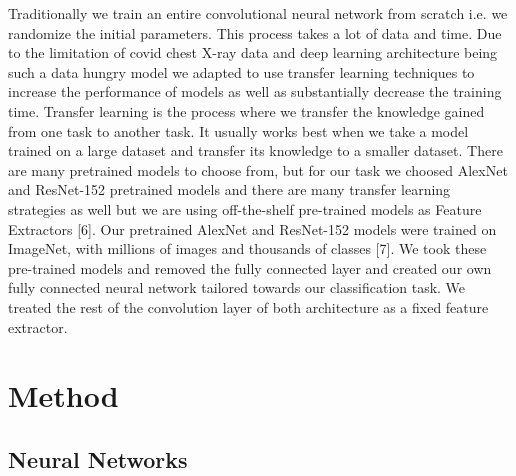 \documentclass[conference,compsoc]{IEEEtran}
\begin{document}
Traditionally we train an entire convolutional neural network from scratch i.e. we randomize the initial parameters. 
This process takes a lot of data and time. Due to the limitation of covid chest X-ray data and deep learning architecture 
being such a data hungry model we adapted to use transfer learning techniques to increase the performance of models as well 
as substantially decrease the training time. Transfer learning is the process where we transfer the knowledge gained from one 
task to another task. It usually works best when we take a model trained on a large dataset and transfer its knowledge to a smaller dataset.
There are many pretrained models to choose from, but for our task we choosed AlexNet and ResNet-152 pretrained models and there are 
many transfer learning strategies as well but we are using off-the-shelf pre-trained models as Feature Extractors [6]. 
Our pretrained AlexNet and ResNet-152 models were trained on ImageNet, with millions of images and thousands of classes
[7]. 
We took these pre-trained models and removed the fully connected layer and created our own fully connected neural network tailored 
towards our classification task. We treated the rest of the convolution layer of both architecture as a fixed feature extractor.  


\section{Method}

\subsection{Neural Networks}

\begin{description}[leftmargin=*,labelindent=0pt]
		\item[AlexNet:] 
		
		\item[ResNet-50:] 

		\item[VGG-19:]

		\item[Our Convolution Neural Network:]

\end{description}
\end{document}
